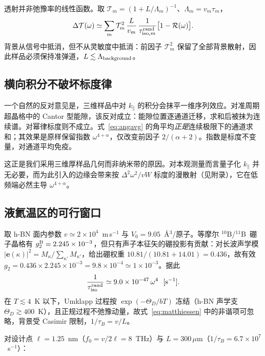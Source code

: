 \documentclass[10pt,twocolumn]{article}
\newcommand{\tenB}{$^{10}$B}
\newcommand{\elevenB}{$^{11}$B}
\newcommand{\Tr}{\mathcal{T}}
\begin{document}
透射并非弛豫率的线性函数。取 $\Tr_m=(1+L/\Lambda_m)^{-1}$、$\Lambda_m=v_m\tau_m$，
\begin{equation}
  \Delta\Tr(\omega)\simeq\sum_m \Tr_m^{2}\,\frac{L}{v_m}\,
    \frac{1}{\tau_{{\rm iso},m}^{\rm rand}}\big[1-\mathcal{R}(\omega)\big].
  \label{eq:dT}
\end{equation}
背景从信号中抵消，但不从灵敏度中抵消：前因子 $\Tr_m^{2}$ 保留了全部背景散射，因此样品必须保持准弹道，$L\lesssim\Lambda_{\rm background}$。

\subsection{横向积分不破坏标度律}

一个自然的反对意见是，三维样品中对 $k_\parallel$ 的积分会抹平一维序列效应。对准周期超晶格中的 Cantor 型能隙，该反对成立：能隙位置逐通道迁移，求和后被抹为连续谱。对幂律标度则不成立。式~\eqref{eq:angavg} 的角平均\emph{正是}连续极限下的通道求和；其效果是原样保留指数 $\omega^{4+\alpha}$，仅改变前因子 $2/(\alpha+2)$。指数是标度不变量，对通道平均免疫。

这正是我们采用三维厚样品几何而非纳米带的原因。对本观测量而言量子化 $k_\parallel$ 并无必要，而为此引入的边缘会带来按 $\Delta^{2}\omega^{2}/vW$ 标度的漫散射（见附录），它在低频端必然主导 $\omega^{4+\alpha}$。

\subsection{液氦温区的可行窗口}
\label{sec:feasibility}

取 h-BN 面内参数 $v\simeq2\times10^{4}$~m\,s$^{-1}$ 与 $V_0=9.05$~\AA$^{3}$/原子。等摩尔 \tenB/\elevenB\ 硼子晶格有 $g_2^{\rm B}=2.245\times10^{-3}$，但只有声子本征矢的硼投影有贡献：对长波声学模 $|\bm e(\kappa)|^{2}=M_\kappa/\sum_{\kappa'}M_{\kappa'}$，给出硼权重 $10.81/(10.81+14.01)=0.436$，故有效 $g_2=0.436\times2.245\times10^{-3}=9.8\times10^{-4}\simeq1\times10^{-3}$。据此
\begin{equation}
  \frac{1}{\tau_{\rm iso}^{\rm rand}} \simeq 9.0\times10^{-47}\,\omega^{4}\ \ [\text{s}^{-1}].
  \label{eq:isorate}
\end{equation}
在 $T\lesssim4$~K 以下，Umklapp 过程按 $\exp(-\Theta_D/bT)$ 冻结（h-BN 声学支 $\Theta_D\gtrsim400$~K），且正规过程不弛豫动量，故式~\eqref{eq:matthiessen} 中的非谐项可忽略，背景受 Casimir 限制，$1/\tau_B=v/L$。

对设计点 $\ell=1.25$~nm（$f_0=v/2\ell=8$~THz）与 $L=300\,\mu$m（$1/\tau_B=6.7\times10^{7}$~s$^{-1}$）：
\end{document}
